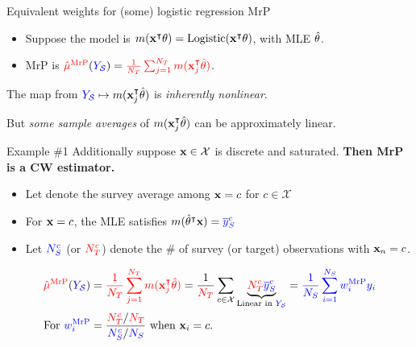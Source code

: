 \begin{frame}[t]{Equivalent weights for (some) logistic regression MrP}
%
\begin{itemize}
    \item Suppose the model is $m(\mathbf{x}^\intercal \theta) = \mathrm{Logistic}(\mathbf{x}^\intercal \theta)$, with MLE $\hat{\theta}$.
    \item MrP is $\textcolor{red}{\hat{\mu}^{\mathrm{MrP}}}(\textcolor{blue}{\textcolor{blue}{Y_{\mathcal{S}}}}) = \textcolor{red}{\frac{1}{{N_T}} \sum_{j=1}^{N_T} m(\mathbf{x}_j^\intercal \hat{\theta})}$.
\end{itemize}

The map from $\textcolor{blue}{\textcolor{blue}{Y_{\mathcal{S}}}} \mapsto m(\mathbf{x}_j^\intercal \hat{\theta})$ is
\emph{inherently nonlinear}.

But \emph{some sample averages}
of $m(\mathbf{x}_j^\intercal \hat{\theta})$ can be approximately linear.\pause

\begin{block}{Example \#1}
Additionally suppose $\mathbf{x} \in \mathcal{X}$ is discrete and saturated.
        \textbf{Then MrP is a CW estimator.}
\end{block}

\pause
\def\ybar{\overline{y}}
\def\Ntarc{\tarcol{N_T^c}}
\def\Nsurc{\surcol{N_S^c}}
%
\begin{itemize}
    \item Let \surcol{$\ybar_S^c$} denote the survey average among $\mathbf{x} = c$ for $c \in \mathcal{X}$\pause
    \item For $\mathbf{x} = c$, the MLE satisfies $m(\thetahat^\trans \x) = \surcol{\ybar_S^c}$\pause
    \item Let $\Nsurc$ (or $\Ntarc$) denote the \# of survey (or target) observations with $\mathbf{x}_n = c$.\pause
\end{itemize}
%
$$
\begin{aligned}
\muhatmrp ={}& \tarcol{\meantar \m(\x_j^\trans \thetahat)}
            = \frac{1}{\tarcol{\Ntar}} \sum_{c \in \mathcal{X}}
            \underbrace{\Ntarc \surcol{\ybar_S^c}}_{\textrm{Linear in }\surcol{\Ysur}}
        = \surcol{\meansur \w_i^\mrp \y_i}
\\ \textrm{For }
\surcol{\w_i^\mrp} ={}&
    \frac{\Ntarc / \tarcol{\Ntar}}{\Nsurc / \surcol{\Nsur}} \textrm{ when }\x_i=c.
\end{aligned}
$$

\end{frame}


